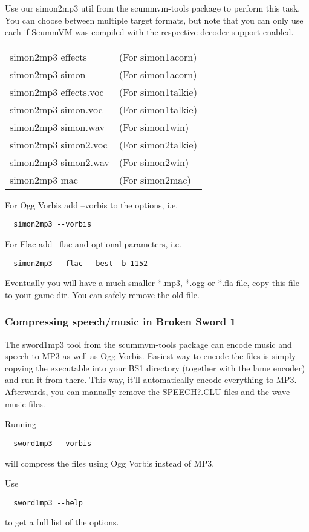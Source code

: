 Use our simon2mp3 util from the scummvm-tools package to perform this task.
You can choose between multiple target formats, but note that you can only use
each if ScummVM was compiled with the respective decoder support enabled.

\begin{tabular}[h]{ll}
  simon2mp3 effects    &(For simon1acorn)\\
  simon2mp3 simon      &(For simon1acorn)\\
  simon2mp3 effects.voc&(For simon1talkie)\\
  simon2mp3 simon.voc  &(For simon1talkie)\\
  simon2mp3 simon.wav  &(For simon1win)\\
  simon2mp3 simon2.voc &(For simon2talkie)\\
  simon2mp3 simon2.wav &(For simon2win)\\
  simon2mp3 mac        &(For simon2mac)\\
\end{tabular}

For Ogg Vorbis add --vorbis to the options, i.e.
\begin{verbatim}
  simon2mp3 --vorbis
\end{verbatim}
%
For Flac add --flac and optional parameters, i.e.
\begin{verbatim}
  simon2mp3 --flac --best -b 1152 
\end{verbatim}
%
Eventually you will have a much smaller *.mp3, *.ogg or *.fla file, copy this
file to your game dir. You can safely remove the old file.

\subsubsection{Compressing speech/music in Broken Sword 1}

The sword1mp3 tool from the scummvm-tools package can encode music and speech
to MP3 as well as Ogg Vorbis.
Easiest way to encode the files is simply copying the executable into your
BS1 directory (together with the lame encoder) and run it from there.
This way, it'll automatically encode everything to MP3.
Afterwards, you can manually remove the SPEECH?.CLU files and the wave music files.

Running 
\begin{verbatim}
  sword1mp3 --vorbis
\end{verbatim}
%
will compress the files using Ogg Vorbis instead of MP3.

Use 
\begin{verbatim}
  sword1mp3 --help
\end{verbatim}
%
to get a full list of the options.

